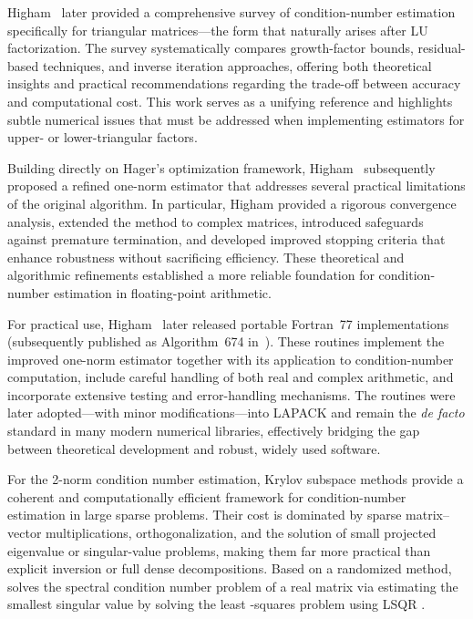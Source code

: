 \documentclass[11pt,a4paper]{article}
\theoremstyle{plain}
\theoremstyle{definition}
\theoremstyle{remark}
\begin{document}
Higham~\cite{Higham1987} later provided a comprehensive survey of condition-number estimation specifically for triangular matrices---the form that naturally arises after LU factorization. The survey systematically compares growth-factor bounds, residual-based techniques, and inverse iteration approaches, offering both theoretical insights and practical recommendations regarding the trade-off between accuracy and computational cost. This work serves as a unifying reference and highlights subtle numerical issues that must be addressed when implementing estimators for upper- or lower-triangular factors.

Building directly on Hager's optimization framework, Higham~\cite{higham1988estimating} subsequently proposed a refined one-norm estimator that addresses several practical limitations of the original algorithm. In particular, Higham provided a rigorous convergence analysis, extended the method to complex matrices, introduced safeguards against premature termination, and developed improved stopping criteria that enhance robustness without sacrificing efficiency. These theoretical and algorithmic refinements established a more reliable foundation for condition-number estimation in floating-point arithmetic.

For practical use, Higham~\cite{higham1988fortran} later released portable Fortran~77 implementations (subsequently published as Algorithm~674 in~\cite{10.1145/63522.214391}). These routines implement the improved one-norm estimator together with its application to condition-number computation, include careful handling of both real and complex arithmetic, and incorporate extensive testing and error-handling mechanisms. The routines were later adopted---with minor modifications---into LAPACK and remain the \emph{de facto} standard in many modern numerical libraries, effectively bridging the gap between theoretical development and robust, widely used software.



For the 2-norm condition number estimation, Krylov subspace methods \cite{lanczos1950iteration, arnoldi1951principle, saad2003iterative} provide a coherent and computationally efficient framework for condition-number estimation in large sparse problems. Their cost is dominated by sparse matrix--vector multiplications, orthogonalization, and the solution of small projected eigenvalue or singular-value problems, making them far more practical than explicit inversion or full dense decompositions. Based on a randomized method, \cite{Avron2019} solves the spectral condition number problem of a real matrix via estimating the smallest singular value by solving the least -squares problem using LSQR \cite{10.1145/355984.355989}. 
\end{document}
